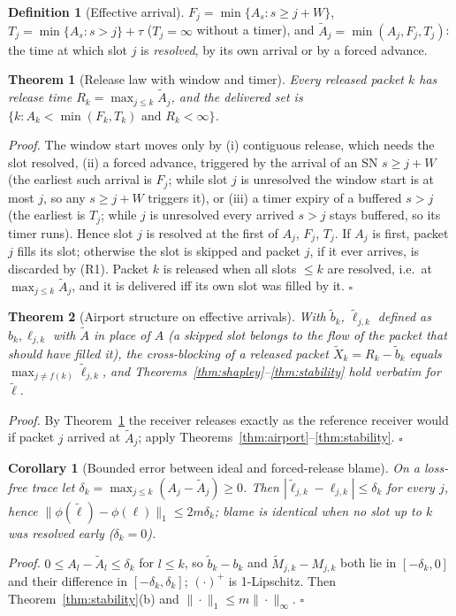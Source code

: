 \documentclass[11pt]{article}
\newtheorem{theorem}{Theorem}
\newtheorem{corollary}{Corollary}
\theoremstyle{definition}
\newtheorem{definition}{Definition}
\begin{document}
\begin{definition}[Effective arrival]
$F_j=\min\{A_s:s\ge j+W\}$, $T_j=\min\{A_s:s>j\}+\tau$ ($T_j=\infty$ without a timer), and $\tilde A_j=\min(A_j,F_j,T_j)$: the time at which slot $j$ is \emph{resolved}, by its own arrival or by a forced advance.
\end{definition}
\begin{theorem}[Release law with window and timer]\label{thm:window}
Every released packet $k$ has release time $R_k=\max_{j\le k}\tilde A_j$, and the delivered set is $\{k:A_k<\min(F_k,T_k)\text{ and }R_k<\infty\}$.
\end{theorem}
\emph{Proof.} The window start moves only by (i) contiguous release, which needs the slot resolved, (ii) a forced advance, triggered by the arrival of an SN $s\ge j+W$ (the earliest such arrival is $F_j$; while slot $j$ is unresolved the window start is at most $j$, so any $s\ge j+W$ triggers it), or (iii) a timer expiry of a buffered $s>j$ (the earliest is $T_j$; while $j$ is unresolved every arrived $s>j$ stays buffered, so its timer runs). Hence slot $j$ is resolved at the first of $A_j$, $F_j$, $T_j$. If $A_j$ is first, packet $j$ fills its slot; otherwise the slot is skipped and packet $j$, if it ever arrives, is discarded by (R1). Packet $k$ is released when all slots $\le k$ are resolved, i.e.\ at $\max_{j\le k}\tilde A_j$, and it is delivered iff its own slot was filled by it. \hfill$\square$

\begin{theorem}[Airport structure on effective arrivals]\label{thm:effective}
With $\tilde b_k$, $\tilde\ell_{j,k}$ defined as $b_k,\ell_{j,k}$ with $\tilde A$ in place of $A$ (a skipped slot belongs to the flow of the packet that should have filled it), the cross-blocking of a released packet $\tilde X_k=R_k-\tilde b_k$ equals $\max_{j\ne f(k)}\tilde\ell_{j,k}$, and Theorems~\ref{thm:shapley}--\ref{thm:stability} hold verbatim for $\tilde\ell$.
\end{theorem}
\emph{Proof.} By Theorem~\ref{thm:window} the receiver releases exactly as the reference receiver would if packet $j$ arrived at $\tilde A_j$; apply Theorems~\ref{thm:airport}--\ref{thm:stability}. \hfill$\square$

\begin{corollary}[Bounded error between ideal and forced-release blame]\label{cor:bound}
On a loss-free trace let $\delta_k=\max_{j\le k}(A_j-\tilde A_j)\ge0$. Then $|\tilde\ell_{j,k}-\ell_{j,k}|\le\delta_k$ for every $j$, hence $\|\phi(\tilde\ell)-\phi(\ell)\|_1\le2m\delta_k$; blame is identical when no slot up to $k$ was resolved early ($\delta_k=0$).
\end{corollary}
\emph{Proof.} $0\le A_l-\tilde A_l\le\delta_k$ for $l\le k$, so $\tilde b_k-b_k$ and $\tilde M_{j,k}-M_{j,k}$ both lie in $[-\delta_k,0]$ and their difference in $[-\delta_k,\delta_k]$; $(\cdot)^+$ is 1-Lipschitz. Then Theorem~\ref{thm:stability}(b) and $\|\cdot\|_1\le m\|\cdot\|_\infty$. \hfill$\square$
\end{document}
